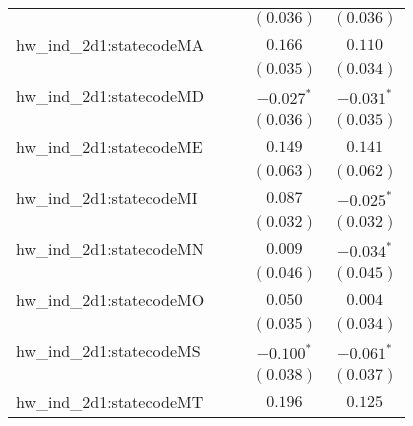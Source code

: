 \begin{center}
\begin{longtable}{l c c c c}
                         &                       &                       & $(0.036)$             & $(0.036)$             \\
hw\_ind\_2d1:statecodeMA &                       &                       & $0.166$               & $0.110$               \\
                         &                       &                       & $(0.035)$             & $(0.034)$             \\
hw\_ind\_2d1:statecodeMD &                       &                       & $\mathbf{-0.027}^{*}$ & $\mathbf{-0.031}^{*}$ \\
                         &                       &                       & $(0.036)$             & $(0.035)$             \\
hw\_ind\_2d1:statecodeME &                       &                       & $0.149$               & $0.141$               \\
                         &                       &                       & $(0.063)$             & $(0.062)$             \\
hw\_ind\_2d1:statecodeMI &                       &                       & $0.087$               & $\mathbf{-0.025}^{*}$ \\
                         &                       &                       & $(0.032)$             & $(0.032)$             \\
hw\_ind\_2d1:statecodeMN &                       &                       & $0.009$               & $\mathbf{-0.034}^{*}$ \\
                         &                       &                       & $(0.046)$             & $(0.045)$             \\
hw\_ind\_2d1:statecodeMO &                       &                       & $0.050$               & $0.004$               \\
                         &                       &                       & $(0.035)$             & $(0.034)$             \\
hw\_ind\_2d1:statecodeMS &                       &                       & $\mathbf{-0.100}^{*}$ & $\mathbf{-0.061}^{*}$ \\
                         &                       &                       & $(0.038)$             & $(0.037)$             \\
hw\_ind\_2d1:statecodeMT &                       &                       & $0.196$               & $0.125$               \\

\end{longtable}
\end{center}
